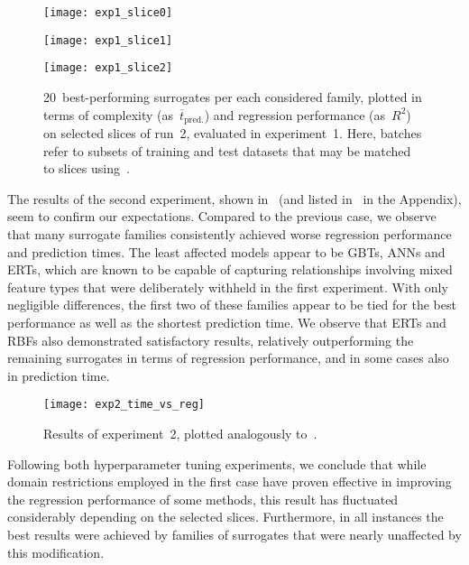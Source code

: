 \begin{figure}[h]
	\centering
	\begin{minipage}{0.333\textwidth}
		\texttt{[image: exp1\_slice0]}
	\end{minipage}\hfill%
	\begin{minipage}{0.333\textwidth}
		\texttt{[image: exp1\_slice1]}
	\end{minipage}\hfill%
	\begin{minipage}{0.333\textwidth}
		\texttt{[image: exp1\_slice2]}
	\end{minipage}
	\caption{20~best-performing surrogates per each considered family, plotted in
		terms of complexity (as~$\overline{t}_{\text{pred.}}$) and regression
		performance (as~$R^2$) on selected slices of run~2, evaluated in
	experiment~1. Here, batches refer to subsets of training and test datasets that
	may be matched to slices using~.}
	\label{fig:exp1-time-vs-reg}
\end{figure}

The results of the second experiment, shown in~ (and listed
in~ in the Appendix),
seem to confirm our expectations. Compared to the previous case, we observe
that many surrogate families consistently achieved worse regression
performance and prediction times. The least
affected models appear to be GBTs, ANNs and ERTs, which are known to be capable of capturing relationships
involving mixed feature types that were deliberately withheld in the first
experiment. With only negligible differences, the first two of these families
appear to be tied for the best performance as well as the shortest prediction
time. We observe that ERTs and RBFs also
demonstrated satisfactory results, relatively outperforming the remaining surrogates in
terms of regression performance, and in some cases also in prediction time.

\begin{figure}
	\centering
	\texttt{[image: exp2\_time\_vs\_reg]}
	\caption{Results of experiment~2, plotted analogously
	to~.}
	\label{fig:exp2-time-vs-reg}
\end{figure}

Following both hyperparameter tuning experiments, we conclude that while domain
restrictions employed in the first case have proven effective in improving the
regression performance of some methods, this result has fluctuated considerably
depending on the selected slices. Furthermore, in all instances the best
results were achieved by families of surrogates that were nearly unaffected by
this modification.


